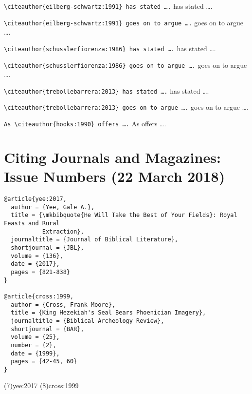 \documentclass[a4paper]{article}
\begin{document}

\verb|\citeauthor{eilberg-schwartz:1991} has stated ….|
\examplenobreak
\citeauthor{eilberg-schwartz:1991} has stated ….

\verb|\citeauthor{eilberg-schwartz:1991} goes on to argue ….|
\examplenobreak
\citeauthor{eilberg-schwartz:1991} goes on to argue ….

\verb|\citeauthor{schusslerfiorenza:1986} has stated ….|
\examplenobreak
\citeauthor{schusslerfiorenza:1986} has stated ….

\verb|\citeauthor{schusslerfiorenza:1986} goes on to argue ….|
\examplenobreak
\citeauthor{schusslerfiorenza:1986} goes on to argue ….

\verb|\citeauthor{trebollebarrera:2013} has stated ….|
\examplenobreak
\citeauthor{trebollebarrera:2013} has stated ….

\verb|\citeauthor{trebollebarrera:2013} goes on to argue ….|
\examplenobreak
\citeauthor{trebollebarrera:2013} goes on to argue ….

\verb|As \citeauthor{hooks:1990} offers ….|
\examplenobreak
As \citeauthor{hooks:1990} offers ….
\exampleabbreviations
\examplebibliography
{}

\section{Citing Journals and Magazines: Issue Numbers (22 March 2018)}

\begin{verbatim}
@article{yee:2017,
  author = {Yee, Gale A.},
  title = {\mkbibquote{He Will Take the Best of Your Fields}: Royal Feasts and Rural
           Extraction},
  journaltitle = {Journal of Biblical Literature},
  shortjournal = {JBL},
  volume = {136},
  date = {2017},
  pages = {821-838}
}

@article{cross:1999,
  author = {Cross, Frank Moore},
  title = {King Hezekiah's Seal Bears Phoenician Imagery},
  journaltitle = {Biblical Archeology Review},
  shortjournal = {BAR},
  volume = {25},
  number = {2},
  date = {1999},
  pages = {42-45, 60}
}
\end{verbatim}

\examplecite(7){yee:2017}
\examplecite(8){cross:1999}
\exampleabbreviations
\examplebibliography
{}
\end{document}
